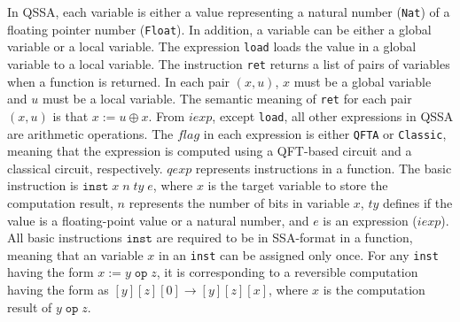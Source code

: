 In QSSA, each variable is either a value representing a natural number (\texttt{Nat}) of a floating pointer number (\texttt{Float}). In addition, a variable can be either a global variable or a local variable. The expression \texttt{load} loads the value in a global variable to a local variable. The instruction \texttt{ret} returns a list of pairs of variables when a function is returned. In each pair $(x,u)$, $x$ must be a global variable and $u$ must be a local variable. The semantic meaning of \texttt{ret} for each pair $(x,u)$ is that $x:=u\oplus x$. From $iexp$, except \texttt{load}, all other expressions in QSSA are arithmetic operations. The $flag$ in each expression is either \texttt{QFTA} or \texttt{Classic}, meaning that the expression is computed using a QFT-based circuit and a classical circuit, respectively. $qexp$ represents instructions in a function. The basic instruction is $\texttt{inst}\;x\;n\;ty\;e$, where $x$ is the target variable to store the computation result, $n$ represents the number of bits in variable $x$, $ty$ defines if the value is a floating-point value or a natural number, and $e$ is an expression ($iexp$). All basic instructions $\texttt{inst}$ are required to be in SSA-format in a function, meaning that an variable $x$ in an \texttt{inst} can be assigned only once. For any \texttt{inst} having the form $x:=y\;\texttt{op}\;z$, it is corresponding to a reversible computation having the form as $[y][z][0]\rightarrow[y][z][x]$, where $x$ is the computation result of $y\;\texttt{op}\;z$.

